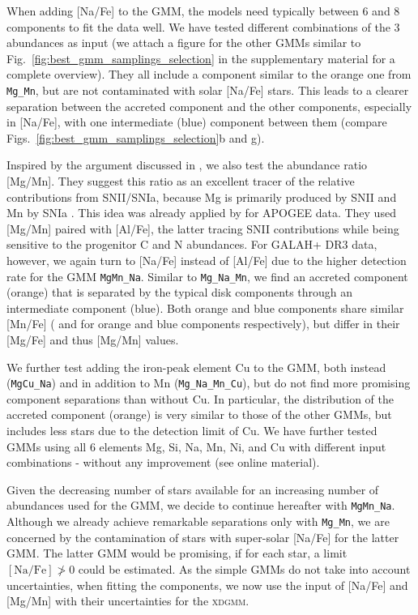 \documentclass[fleqn,usenatbib]{mnras}
\begin{document}
When adding [Na/Fe] to the GMM, the models need typically between 6 and 8 components to fit the data well. We have tested different combinations of the 3 abundances as input (we attach a figure for the other GMMs similar to Fig.~\ref{fig:best_gmm_samplings_selection} in the supplementary material for a complete overview). They all include a component similar to the orange one from \texttt{Mg\_Mn}, but are not contaminated with solar [Na/Fe] stars. This leads to a clearer separation between the accreted component and the other components, especially in [Na/Fe], with one intermediate (blue) component between them (compare Figs.~\ref{fig:best_gmm_samplings_selection}b and g). 

Inspired by the argument discussed in \citet{Hawkins2015}, we also test the abundance ratio [Mg/Mn]. They suggest this ratio as an excellent tracer of the relative contributions from SNII/SNIa, because Mg is primarily produced by SNII \citep{Nomoto2013} and Mn by SNIa \citep{Gratton1989}. This idea was already applied by \citet{Das2020} for APOGEE data. They used [Mg/Mn] paired with [Al/Fe], the latter tracing SNII contributions while being sensitive to the progenitor C and N abundances. For GALAH+ DR3 data, however, we again turn to [Na/Fe] instead of [Al/Fe] due to the higher detection rate for the GMM \texttt{MgMn\_Na}. Similar to \texttt{Mg\_Na\_Mn}, we find an accreted component (orange) that is separated by the typical disk components through an intermediate component (blue). Both orange and blue components share similar [Mn/Fe] ( and  for orange and blue components respectively), but differ in their [Mg/Fe] and thus [Mg/Mn] values.

We further test adding the iron-peak element Cu to the GMM, both instead (\texttt{MgCu\_Na}) and in addition to Mn (\texttt{Mg\_Na\_Mn\_Cu}), but do not find more promising component separations than without Cu. In particular, the distribution of the accreted component (orange) is very similar to those of the other GMMs, but includes less stars due to the detection limit of Cu. We have further tested GMMs using all 6 elements Mg, Si, Na, Mn, Ni, and Cu with different input combinations - without any improvement (see online material).

Given the decreasing number of stars available for an increasing number of abundances used for the GMM, we decide to continue hereafter with \texttt{MgMn\_Na}. Although we already achieve remarkable separations only with \texttt{Mg\_Mn}, we are concerned by the contamination of stars with super-solar [Na/Fe] for the latter GMM. The latter GMM would be promising, if for each star, a limit $\mathrm{[Na/Fe]} \ngtr 0$ could be estimated. As the simple GMMs do not take into account uncertainties, when fitting the components, we now use the input of [Na/Fe] and [Mg/Mn] with their uncertainties for the \textsc{xdgmm}.
\end{document}
